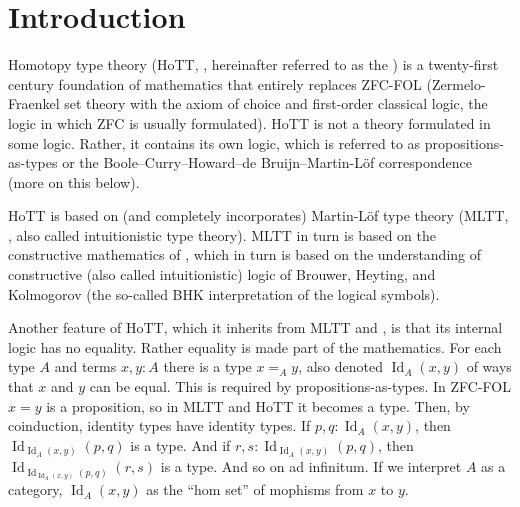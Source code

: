 \documentclass[11pt]{article}
\DeclareMathOperator{\idtype}{Id}
\begin{document}
\begin{abstract}
HoTT has higher inductive types that not only construct terms of the type
but also identity types of the type.  These are needed for synthetic homotopy
theory.  It also has inductive-inductive types that define multiple types
that interact simultaneously.  Examples are the real and surreal numbers and
their order relations.  The problem here is that conditions for such
definitions are imperfectly understood.
\end{abstract}

\section{Introduction}

Homotopy type theory (HoTT, \citealp{hott-book}, hereinafter referred to
as the )
is a twenty-first century foundation of mathematics that entirely replaces
ZFC-FOL (Zermelo-Fraenkel set theory with the axiom of choice and first-order
classical logic, the logic in which ZFC is usually formulated).
HoTT is not a theory formulated in some logic.  Rather, it contains its own
logic, which is referred to as propositions-as-types or the
Boole--Curry--Howard--de Bruijn--Martin-L\"{o}f correspondence
(more on this below).

HoTT is based on (and completely incorporates) 
Martin-L\"{o}f type theory (MLTT, \citealp{martin-lof-mltt}, also called
intuitionistic type theory).
MLTT in turn is based on the constructive mathematics of \citet{bishop},
which in turn is based on the understanding of constructive (also called
intuitionistic) logic of Brouwer, Heyting, and Kolmogorov (the so-called
BHK interpretation of the logical symbols).

Another feature of HoTT, which it inherits from MLTT and \citet{bishop},
is that its internal logic has no equality.  Rather equality is made part of
the mathematics.  For each type $A$ and terms $x, y : A$ there is a type
$x =_A y$, also denoted $\idtype_A(x, y)$ of ways that $x$ and $y$ can be
equal.
This is required by propositions-as-types.  In ZFC-FOL $x = y$ is
a proposition, so in MLTT and HoTT it becomes a type.
Then, by coinduction, identity types have identity types.
If $p, q : \idtype_A(x, y)$, then $\idtype_{\idtype_A(x, y)}(p, q)$ is a type.
And if $r, s : \idtype_{\idtype_A(x, y)}(p, q)$,
then $\idtype_{\idtype_{\idtype_A(x, y)}(p, q)}(r, s)$ is a type.
And so on ad infinitum.
If we interpret $A$ as a category,
$\idtype_A(x, y)$ as the ``hom set'' of mophisms from $x$ to $y$.
\end{document}
